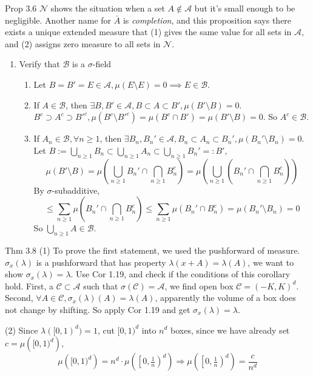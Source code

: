 \begin{note}{Prop 3.6}
    $\mathcal{N}$ shows the situation when a set $A\notin\mathcal{A}$ but it's small enough to be negligible. Another name for $\bar{A}$ is \emph{completion}, and this proposition says there exists a unique extended measure that (1) gives the same value for all sets in $\mathcal{A}$, and (2) assigns zero measure to all sets in $\mathcal{N}$.
    \begin{enumerate}
        \item Verify that $\mathcal{B}$ is a $\sigma$-field
        \begin{enumerate}
            \item Let $B=B'=E\in\mathcal{A}, \mu(E\setminus E)=0\implies E\in\mathcal{B}$.
            \item If $A\in\mathcal{B}$, then $\exists B,B'\in\mathcal{A}, B\subset A\subset B',\mu(B'\setminus B)=0$. $B^c\supset A^c\supset B'^c,\mu(B^c\setminus B'^c)=\mu(B^c\cap B')=\mu(B'\setminus B)=0$. So $A^c\in\mathcal{B}$.
            \item If $A_n\in\mathcal{B},\forall n\ge 1$, then $\exists B_n,B_n'\in\mathcal{A}, B_n\subset A_n\subset B_n',\mu(B_n'\setminus B_n)=0$. Let $B:=\bigcup_{n\ge 1}B_n\subset \bigcup_{n\ge 1}A_n\subset \bigcup_{n\ge 1}B_n'=:B'$,
            \[
            \mu(B'\setminus B)=\mu\left(
            \bigcup_{n\ge 1}B_n'\cap \bigcap_{n\ge 1}B_n^c
            \right)=\mu\left(
            \bigcup_{n\ge 1}(B_n'\cap \bigcap_{n\ge 1}B_n^c)
            \right)
            \]
            By $\sigma$-subadditive,
            \[
            \le \sum_{n\ge 1}\mu (B_n'\cap \bigcap_{n\ge 1}B_n^c)\le \sum_{n\ge 1}\mu (B_n'\cap B_n^c)=\mu(B_n'\setminus B_n)=0
            \]
            So $\bigcup_{n\ge 1}A\in\mathcal{B}$.
        \end{enumerate}
    \end{enumerate}
\end{note}

\begin{note}{Thm 3.8}
    (1) To prove the first statement, we used the pushforward of measure. $\sigma_x(\lambda)$ is a pushforward that has property $\lambda(x+A)=\lambda(A)$, we want to show $\sigma_x(\lambda)=\lambda$. Use Cor 1.19, and check if the conditions of this corollary hold. First, a $\mathcal{C}\subset\mathcal{A}$ such that $\sigma(\mathcal{C})=\mathcal{A}$, we find open box $\mathcal{C}=(-K,K)^d$. Second, $\forall A\in\mathcal{C}, \sigma_x(\lambda)(A)=\lambda(A)$, apparently the volume of a box does not change by shifting. So apply Cor 1.19 and get $\sigma_x(\lambda)=\lambda$.

    (2) Since $\lambda([0,1)^d)=1$, cut $[0,1)^d$ into $n^d$ boxes, since we have already set $c=\mu\left([0,1)^d\right)$, 
    \[
    \mu\left([0,1)^d\right) = n^d \cdot \mu\left(\left[0,\tfrac{1}{n}\right)^d\right)
\Rightarrow
\mu\left(\left[0,\tfrac{1}{n}\right)^d\right) = \frac{c}{n^d}
    \]
\end{note}

